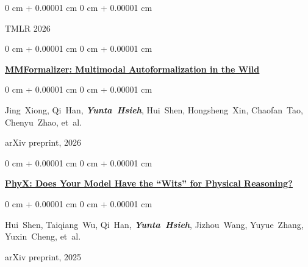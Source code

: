 \documentclass[10pt, letterpaper]{article}
\newenvironment{onecolentry}{
    \begin{adjustwidth}{
        0 cm + 0.00001 cm
    }{
        0 cm + 0.00001 cm
    }
}{
    \end{adjustwidth}
} %
\begin{document}
\begin{samepage}
\begin{onecolentry}
                \vspace{0.05 cm}
                TMLR 2026
            \end{onecolentry}
            
            \vspace{0.10 cm}
            
            \begin{onecolentry}
                \href{https://arxiv.org/pdf/2601.03017}
                {\uline{\textbf{MMFormalizer: Multimodal Autoformalization in the Wild}}}
            \end{onecolentry}
            
            \vspace{0.10 cm}
            
            \begin{onecolentry}
                \mbox{Jing Xiong}, 
                \mbox{Qi Han}, 
                \textbf{\textit{\mbox{Yunta Hsieh}}}, 
                \mbox{Hui Shen}, 
                \mbox{Hongsheng Xin}, 
                \mbox{Chaofan Tao}, 
                \mbox{Chenyu Zhao}, 
                \mbox{et al.}
                
                \vspace{0.05 cm}
                arXiv preprint, 2026
            \end{onecolentry}
            
            \vspace{0.10 cm}
            
            \begin{onecolentry}
                \href{https://arxiv.org/pdf/2505.15929}
                {\uline{\textbf{PhyX: Does Your Model Have the ``Wits'' for Physical Reasoning?}}}
            \end{onecolentry}
            
            \vspace{0.10 cm}
            
            \begin{onecolentry}
                \mbox{Hui Shen}, 
                \mbox{Taiqiang Wu}, 
                \mbox{Qi Han}, 
                \textbf{\textit{\mbox{Yunta Hsieh}}}, 
                \mbox{Jizhou Wang}, 
                \mbox{Yuyue Zhang}, 
                \mbox{Yuxin Cheng}, 
                \mbox{et al.}
                
                \vspace{0.05 cm}
                arXiv preprint, 2025
            \end{onecolentry}
        \end{samepage}  
\end{document}
